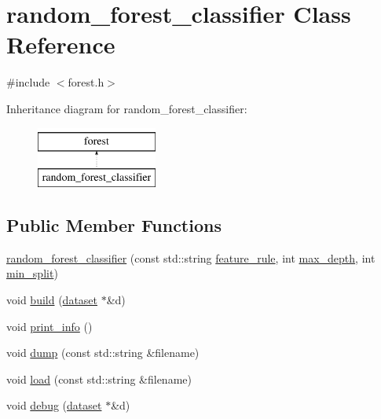 \hypertarget{classrandom__forest__classifier}{\section{random\+\_\+forest\+\_\+classifier Class Reference}
\label{classrandom__forest__classifier}
}


{\ttfamily \#include $<$forest.\+h$>$}

Inheritance diagram for random\+\_\+forest\+\_\+classifier\+:\begin{figure}[H]
\begin{center}
\leavevmode
\includegraphics[height=2.000000cm]{classrandom__forest__classifier}
\end{center}
\end{figure}
\subsection*{Public Member Functions}
\begin{DoxyCompactItemize}
\item 
\hyperlink{classrandom__forest__classifier_a1df1fdafc77419d4161f7c0432d91569}{random\+\_\+forest\+\_\+classifier} (const std\+::string \hyperlink{classforest_ab0e48cb7addef717515b7e50d8448215}{feature\+\_\+rule}, int \hyperlink{classforest_a97477164b075fe86ee3e7b410d848df3}{max\+\_\+depth}, int \hyperlink{classforest_adb7bee85249f613b64e82e2f855c2a39}{min\+\_\+split})
\item 
void \hyperlink{classrandom__forest__classifier_a3fb25f77385017d1f9ec192abcfafdb7}{build} (\hyperlink{classdataset}{dataset} $\ast$\&d)
\item 
void \hyperlink{classrandom__forest__classifier_a34e9792a330c469b556e359c72bcdd79}{print\+\_\+info} ()
\item 
void \hyperlink{classrandom__forest__classifier_a4445560bd2d519df62f14261a5678e12}{dump} (const std\+::string \&filename)
\item 
void \hyperlink{classrandom__forest__classifier_a2fbf4ea4e569a62927f96517db8d4e81}{load} (const std\+::string \&filename)
\item 
void \hyperlink{classrandom__forest__classifier_a003a0815504a8b9ba2a539cd160c3eba}{debug} (\hyperlink{classdataset}{dataset} $\ast$\&d)
\end{DoxyCompactItemize}
